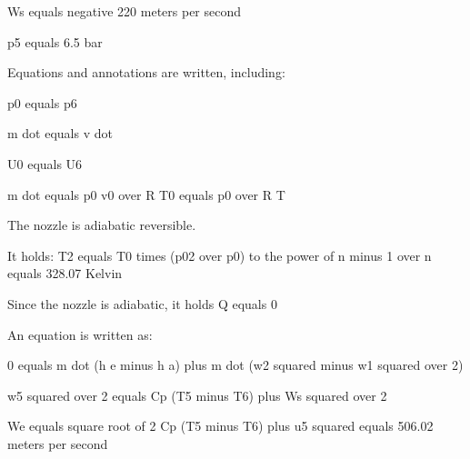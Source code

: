 Ws equals negative 220 meters per second

p5 equals 6.5 bar

Equations and annotations are written, including:

p0 equals p6

m dot equals v dot

U0 equals U6

m dot equals p0 v0 over R T0 equals p0 over R T

The nozzle is adiabatic reversible.

It holds: T2 equals T0 times (p02 over p0) to the power of n minus 1 over n equals 328.07 Kelvin

Since the nozzle is adiabatic, it holds Q equals 0

An equation is written as:

0 equals m dot (h e minus h a) plus m dot (w2 squared minus w1 squared over 2)

w5 squared over 2 equals Cp (T5 minus T6) plus Ws squared over 2

We equals square root of 2 Cp (T5 minus T6) plus u5 squared equals 506.02 meters per second